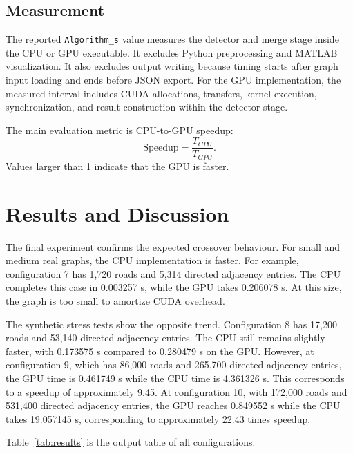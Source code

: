\documentclass[conference]{IEEEtran}
\begin{document}
\subsection{Measurement}

The reported \texttt{Algorithm\_s} value measures the detector and merge stage inside the CPU or GPU executable. It excludes Python preprocessing and MATLAB visualization. It also excludes output writing because timing starts after graph input loading and ends before JSON export. For the GPU implementation, the measured interval includes CUDA allocations, transfers, kernel execution, synchronization, and result construction within the detector stage.

The main evaluation metric is CPU-to-GPU speedup:
\begin{equation}
\text{Speedup} = \frac{T_{CPU}}{T_{GPU}}.
\end{equation}
Values larger than 1 indicate that the GPU is faster.

\section{Results and Discussion}

The final experiment confirms the expected crossover behaviour. For small and medium real graphs, the CPU implementation is faster. For example, configuration 7 has 1,720 roads and 5,314 directed adjacency entries. The CPU completes this case in 0.003257 s, while the GPU takes 0.206078 s. At this size, the graph is too small to amortize CUDA overhead.

The synthetic stress tests show the opposite trend. Configuration 8 has 17,200 roads and 53,140 directed adjacency entries. The CPU still remains slightly faster, with 0.173575 s compared to 0.280479 s on the GPU. However, at configuration 9, which has 86,000 roads and 265,700 directed adjacency entries, the GPU time is 0.461749 s while the CPU time is 4.361326 s. This corresponds to a speedup of approximately 9.45. At configuration 10, with 172,000 roads and 531,400 directed adjacency entries, the GPU reaches 0.849552 s while the CPU takes 19.057145 s, corresponding to approximately 22.43 times speedup.

Table~\ref{tab:results} is the output table of all configurations.
\end{document}
